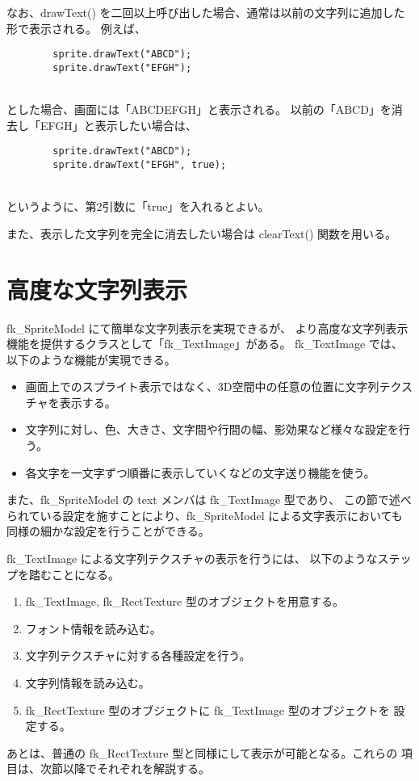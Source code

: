 なお、drawText() を二回以上呼び出した場合、通常は以前の文字列に追加した形で表示される。
例えば、
\\
\begin{screen}
\begin{verbatim}
        sprite.drawText("ABCD");
        sprite.drawText("EFGH");
\end{verbatim}
\end{screen}
~ \\
とした場合、画面には「ABCDEFGH」と表示される。
以前の「ABCD」を消去し「EFGH」と表示したい場合は、
\\
\begin{screen}
\begin{verbatim}
        sprite.drawText("ABCD");
        sprite.drawText("EFGH", true);
\end{verbatim}
\end{screen}
~ \\
というように、第2引数に「true」を入れるとよい。

また、表示した文字列を完全に消去したい場合は clearText() 関数を用いる。

\section{高度な文字列表示} \label{sec:textimage}

fk\_SpriteModel にて簡単な文字列表示を実現できるが、
より高度な文字列表示機能を提供するクラスとして「fk\_TextImage」がある。
fk\_TextImage では、以下のような機能が実現できる。
\begin{itemize}
 \item 画面上でのスプライト表示ではなく、3D空間中の任意の位置に文字列テクスチャを表示する。
 \item 文字列に対し、色、大きさ、文字間や行間の幅、影効果など様々な設定を行う。
 \item 各文字を一文字ずつ順番に表示していくなどの文字送り機能を使う。
\end{itemize}
また、fk\_SpriteModel の text メンバは fk\_TextImage 型であり、
この節で述べられている設定を施すことにより、fk\_SpriteModel による文字表示においても
同様の細かな設定を行うことができる。

fk\_TextImage による文字列テクスチャの表示を行うには、
以下のようなステップを踏むことになる。
\begin{enumerate}
 \item fk\_TextImage, fk\_RectTexture 型のオブジェクトを用意する。
 \item フォント情報を読み込む。
 \item 文字列テクスチャに対する各種設定を行う。
 \item 文字列情報を読み込む。
 \item fk\_RectTexture 型のオブジェクトに fk\_TextImage 型のオブジェクトを
	設定する。
\end{enumerate}
あとは、普通の fk\_RectTexture 型と同様にして表示が可能となる。これらの
項目は、次節以降でそれぞれを解説する。

